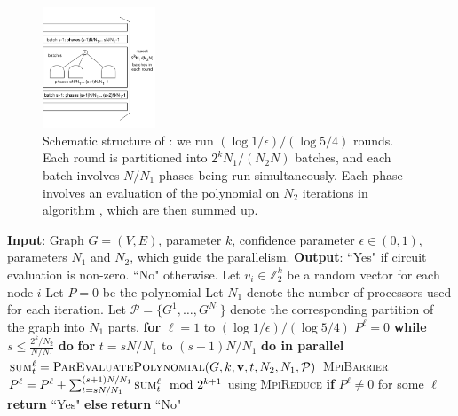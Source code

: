 \begin{figure}[h]
\centering
\includegraphics[width=0.3\textwidth]{img/parallel.pdf}
\caption{
\small
Schematic structure of \parmaxwt{}: we run $(\log{1/\epsilon})/(\log{5/4})$ rounds.
Each round is partitioned into $2^kN_1/(N_2N)$ batches, and each batch involves
$N/N_1$ phases being run simultaneously. Each phase involves an evaluation of the
polynomial on $N_2$ iterations in algorithm \parcircuit{}, which are then summed up.
}
\label{fig:parallel}
\end{figure}

\begin{algorithm}{}
\small
\caption{\parmaxwt{}$(G, k, \epsilon, N_1, N_2)$.}
\label{alg:parallel-kMLD} 
\begin{algorithmic}[1]
\STATE \textbf{Input}: Graph $G=(V,E)$, parameter $k$,
confidence parameter $\epsilon\in (0, 1)$, parameters $N_1$ and $N_2$, which guide the parallelism.
\STATE\textbf{Output}: ``Yes" if circuit evaluation is non-zero. ``No" otherwise.
\STATE 
\STATE Let $v_i \in \mathbb{Z}_2^k$ be a random vector for each node $i$
\STATE Let $P = 0$ be the polynomial
\STATE Let $N_1$ denote the number of processors used for each iteration.
Let $\mathcal{P}=\{G^1, \ldots, G^{N_1}\}$ denote the corresponding partition of the graph into $N_1$ parts.
\STATE \textbf{for} $\ell=1$ to $(\log{1/\epsilon})/(\log{5/4})$ 
\STATE \quad $P^{\ell}=0$
\STATE \quad \textbf{while} $s \leq \frac{2^k/N_2}{N/N_1}$ \textbf{do}
\STATE \quad \quad \textbf{for} $t =s N/N_1$ to $(s+ 1)N/N_1$ \textbf{do in parallel}
\STATE \quad \qquad  $\textsc{sum}^{\ell}_{t} = \textsc{ParEvaluatePolynomial}(G, k, \mathbf{v}, t, N_2, N_1, \mathcal{P})$
\STATE \quad \quad \textsc{MpiBarrier}
\STATE \quad \quad $P^{\ell} = P^{\ell} + \sum_{t=s N/N_1}^{(s+1)N/N_1} \textsc{sum}^{\ell}_{t} \mod 2^{k+1}$ using \textsc{MpiReduce}
\STATE \textbf{if} $P^{\ell}\neq 0$ for some $\ell$
\STATE \quad \textbf{return} ``Yes"
\STATE \textbf{else} 
\STATE \quad \textbf{return} ``No"
\end{algorithmic}
\end{algorithm}

